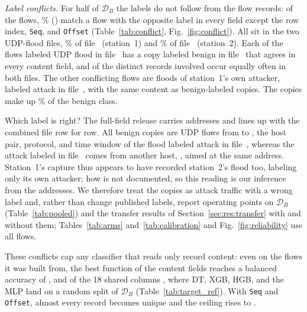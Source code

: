 \documentclass{ieeeaccess}
\newcommand{\DB}{\ensuremath{\mathcal{D}_{B}}}
\begin{document}
\emph{Label conflicts.} For half of \DB{} the labels do not follow from the flow records: of the \NDbFlows{} flows, \LcShareAll\% (\LcFlowsAll) match a flow with the opposite label in every field except the row index, \texttt{Seq}, and \texttt{Offset} (Table~\ref{tab:conflict}, Fig.~\ref{fig:conflict}). All sit in the two UDP-flood files, \LcBenignFileConf\% of file~\LcBenignFile{} (station~1) and \LcAttackFileConf\% of file~\LcAttackFile{} (station~2). Each of the \LcTwinAttack{} flows labeled UDP flood in file~\LcAttackFile{} has a copy labeled benign in file~\LcBenignFile{} that agrees in every content field, and \LcTwinEqual{} of the \LcTwinRecords{} distinct records involved occur equally often in both files. The other \LcOwnConf{} conflicting flows are floods of station~1's own attacker, labeled attack in file~\LcBenignFile{}, with the same content as benign-labeled copies. The copies make up \LcBenignTwinPct\% of the benign class.

Which label is right? The full-field release carries addresses and lines up with the combined file row for row. All \LcTwinBenign{} benign copies are UDP flows from \LcAddrSrc{} to \LcAddrDst{}, the host pair, protocol, and time window of the flood labeled attack in file~\LcAttackFile{}, whereas the attack labeled in file~\LcBenignFile{} comes from another host, \LcAddrOwnSrc{}, aimed at the same address. Station~1's capture thus appears to have recorded station~2's flood too, labeling only its own attacker; how is not documented, so this reading is our inference from the addresses. We therefore treat the copies as attack traffic with a wrong label and, rather than change published labels, report operating points on \DB{} (Table~\ref{tab:pooled}) and the transfer results of Section~\ref{sec:res:transfer} with and without them; Tables~\ref{tab:arms} and~\ref{tab:calibration} and Fig.~\ref{fig:reliability} use all flows.

These conflicts cap any classifier that reads only record content: even on the flows it was built from, the best function of the \LcNFeat{} content fields reaches a balanced accuracy of \LcCeilNative{}, and of the 18 shared columns \LcCeilShared{}, where DT, XGB, HGB, and the MLP land on a random split of \DB{} (Table~\ref{tab:target_ref}). With \texttt{Seq} and \texttt{Offset}, almost every record becomes unique and the ceiling rises to \LcCeilPos{}.
\end{document}
